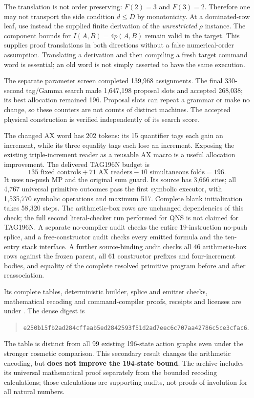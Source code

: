 The translation is not order preserving: $F(2)=3$ and $F(3)=2$. Therefore
one may not transport the side condition $d\le D$ by monotonicity. At a
dominated-row leaf, use instead the supplied finite derivation of the
\emph{unrestricted} $\rho$ instance. The component bounds for
$I(A,B)=4p(A,B)$ remain valid in the target. This supplies proof translations
in both directions without a false numerical-order assumption. Translating
a derivation and then compiling a fresh target command word is essential;
an old word is not simply asserted to have the same execution.

The separate parameter screen completed 139,968 assignments. The final
330-second tag/Gamma search made 1,647,198 proposal slots and accepted
268,038; its best allocation remained 196. Proposal slots can repeat a
grammar or make no change, so these counters are not counts of distinct
machines. The accepted physical construction is verified independently of
its search score.

The changed AX word has 202 tokens: its 15 quantifier tags each gain an
increment, while its three equality tags each lose an increment. Exposing
the existing triple-increment reader as a reusable AX macro is a useful
allocation improvement. The delivered TAG196N budget is
\[
 135\text{ fixed controls}+71\text{ AX readers}
      -10\text{ simultaneous folds}=196.
\]
It uses no-push MP and the original sum guard. Its source has 3,666 sites;
all 4,767 universal primitive outcomes pass the first symbolic executor,
with 1,535,770 symbolic operations and maximum 517. Complete blank
initialization takes 58,320 steps. The arithmetic-box rows are unchanged
dependencies of this check; the full second literal-checker run performed
for QNS is not claimed for TAG196N. A separate no-compiler audit checks
the entire 19-instruction no-push splice, and a free-constructor audit
checks every emitted formula and the ten-entry stack interface. A further
source-binding audit checks all 46 arithmetic-box rows against the frozen
parent, all 61 constructor prefixes and four-increment bodies, and equality
of the complete resolved primitive program before and after reassociation.

Its complete tables, deterministic builder, splice and emitter checks,
mathematical recoding and command-compiler proofs, receipts and licenses
are under . The dense digest is
\begin{quote}\small\nolinkurl{e250b15fb2ad284cffaab5ed2842593f51d2ad7eec6c707aa42786c5ce3cfac6}.\end{quote}
The table is distinct from all 99 existing 196-state action graphs even
under the stronger cosmetic comparison. This secondary result changes
the arithmetic encoding, but \textbf{does not improve the 194-state bound}.
The archive includes its universal mathematical proof separately from the
bounded recoding calculations; those calculations are supporting audits,
not proofs of involution for all natural numbers.


